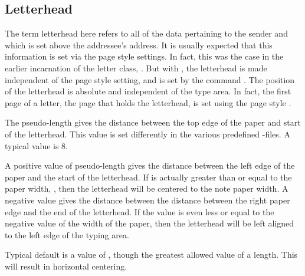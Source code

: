 \subsection{Letterhead}
\label{sec:scrlttr2-experts.firstHead}

The term letterhead here refers to all of the data pertaining to the sender
and which is set above the addressee's address. It is usually expected that
this information is set via the page style settings. In fact, this was the
case in the earlier incarnation of the letter class,
. But with , the
letterhead is made independent of the page style setting, and is set by the
command .
\iftrue%
The position of the letterhead is absolute and independent of the type
area. In fact, the first page of a letter, the page that holds the letterhead,
is set using the page style .%
\fi

\begin{Declaration}
\end{Declaration}
%
The pseudo-length  gives the distance between the top
edge of the paper and start of the letterhead. This value is set differently
in the various predefined
-files. A
typical value is 8.%
%


\begin{Declaration}
\end{Declaration}
%
A positive value of pseudo-length
 gives the distance
between the left edge of the paper and the start of the
letterhead. If is actually greater than or equal to the
paper width,
,
then the letterhead will be centered to the note paper width. A negative value
gives the distance between the distance between the right paper edge and the
end of the letterhead. If the value is even less or equal to the negative
value of the width of the paper, then the letterhead will be left aligned to
the left edge of the typing area.

Typical default is a value of
, though the greatest allowed value of
a length. This will result in horizontal centering.%
%
%


